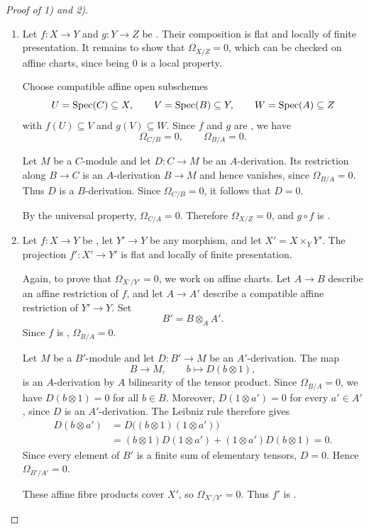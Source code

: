 \begin{proof}[Proof of 1) and 2)]
	\begin{enumerate}
		\item 	Let $f:X\to Y$ and $g:Y\to Z$ be \etale.
		Their composition is flat and locally of finite
		presentation. It remains to show that
		$\Omega_{X/Z}=0$, which can be checked on affine charts, since being $0$ is a local property.
		
		Choose compatible affine open subschemes
		\[
		U=\operatorname{Spec}\!\left(C\right)\subseteq X,\qquad
		V=\operatorname{Spec}\!\left(B\right)\subseteq Y,\qquad
		W=\operatorname{Spec}\!\left(A\right)\subseteq Z
		\]
		with $f(U)\subseteq V$ and $g(V)\subseteq W$.
		Since $f$ and $g$ are \etale, we have
		\[
		\Omega_{C/B}=0,
		\qquad
		\Omega_{B/A}=0.
		\]
		
		Let $M$ be a $C$-module and let $D:C\to M$
		be an $A$-derivation.
		Its restriction along $B\to C$ is an
		$A$-derivation $B\to M$ and hence vanishes,
		since $\Omega_{B/A}=0$.
		Thus $D$ is a $B$-derivation.
		Since $\Omega_{C/B}=0$, it follows that $D=0$.
		
		By the universal property, $\Omega_{C/A}=0$.
		Therefore $\Omega_{X/Z}=0$, and $g\circ f$ is \etale.
		
		\item Let $f:X\to Y$ be \etale, let $Y'\to Y$ be
		any morphism, and let $X'=X\times_Y Y'$.
		The projection $f':X'\to Y'$ is flat and
		locally of finite presentation.
		
		Again, to prove that $\Omega_{X'/Y'}=0$, we work on
		affine charts. Let  $A\to B$ describe an affine
		restriction of $f$, and let $A\to A'$ describe
		a compatible affine restriction of $Y'\to Y$.
		Set
		\[
		B'=B\otimes_A A'.
		\]
		Since $f$ is \etale, $\Omega_{B/A}=0$.
		
		Let $M$ be a $B'$-module and let $D:B'\to M$
		be an $A'$-derivation.
		The map
		\[
		B\longrightarrow M,
		\qquad b\longmapsto D(b\otimes 1),
		\]
		is an $A$-derivation by $A$ bilinearity of the tensor product. Since  $\Omega_{B/A} = 0$, we have $D(b\otimes 1) = 0$ for all $b\in B$.
		Moreover, $D(1\otimes a')=0$ for every $a'\in A'$, since $D$ is an $A'$-derivation.
		The Leibniz rule therefore gives
		\begin{align*}
			D(b\otimes a')
			&= D\bigl((b\otimes 1)(1\otimes a')\bigr) \\
			&= (b\otimes 1)D(1\otimes a') + (1\otimes a')D(b\otimes 1) = 0.
		\end{align*}
		Since every element of $B'$ is a finite sum of elementary tensors, $D=0$.
		Hence $\Omega_{B'/A'}=0$.
		
		These affine fibre products cover $X'$,
		so $\Omega_{X'/Y'}=0$. Thus $f'$ is \etale.
	\end{enumerate}
\end{proof}


